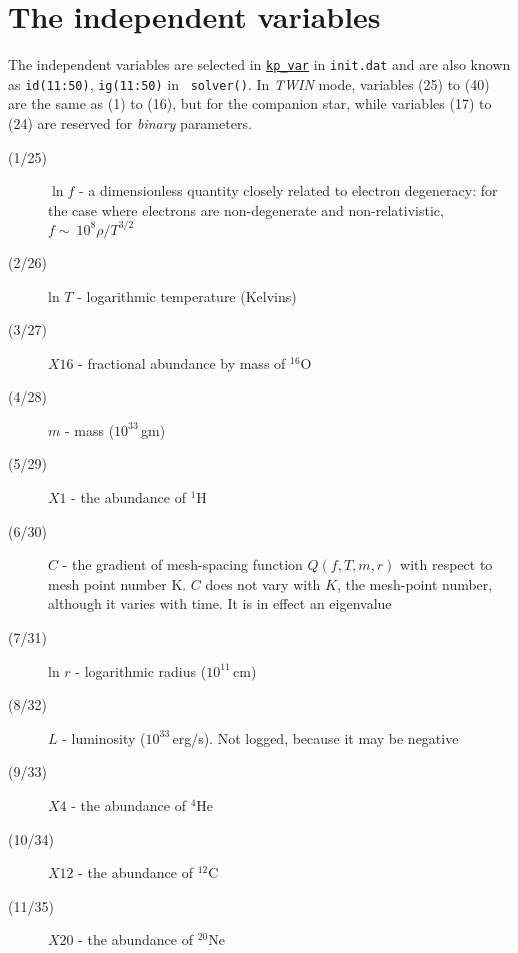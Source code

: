 \hypertarget{indvars}{}
\section{The independent variables}
\label{sec:indvars}

The independent variables are selected in \hyperlink{kp_var}{\texttt{kp\_var}} in \texttt{init.dat}
and are also known as \texttt{id(11:50)}, \texttt{ig(11:50)} in \eg\ \texttt{solver()}.
In \emph{TWIN} mode, variables (25) to (40) are the same as (1) to (16), but for
the companion star, while variables (17) to (24) are reserved for \emph{binary}
parameters.



\begin{description}
\item[(1/25)]  $\ln f$ - a dimensionless quantity closely related to electron 
degeneracy: for the case where electrons are non-degenerate and non-relativistic, 
$f \sim \ 10^8 \rho/T^{3/2}$ 
\item[(2/26)]  ln $T$ - logarithmic temperature (Kelvins)
\item[(3/27)]  $X16$  - fractional abundance by mass of $^{16}$O
\item[(4/28)]  $m$ - mass ($10^{33}\,$gm)
\item[(5/29)]  $X1$    - the abundance of $^1$H
\item[(6/30)]  $C$    - the gradient of mesh-spacing function $Q(f,T,m,r)$ with
respect to mesh point number K. $C$ does not vary with $K$, the mesh-point number,
            although it varies with time. It is in effect an eigenvalue
\item[(7/31)]  ln $r$ - logarithmic radius ($10^{11}\,$cm)
\item[(8/32)]  $L$    - luminosity ($10^{33}\,$erg/s). Not logged, because it
                  may be negative
\item[(9/33)] $X4$   - the abundance of $^4$He
\item[(10/34)] $X12$  - the abundance of $^{12}$C
\item[(11/35)] $X20$  - the abundance of $^{20}$Ne
\end{description}

